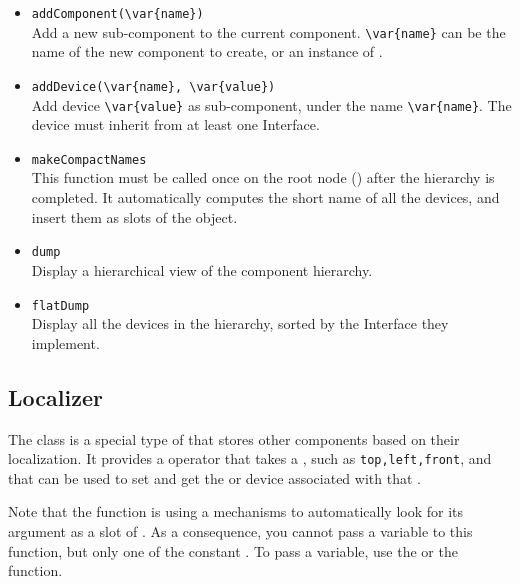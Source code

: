 \begin{itemize}

\item \lstinline|addComponent(\var{name})|\\
  Add a new sub-component to the current component. \lstinline|\var{name}| can
  be the name of the new component to create, or an instance of
  .

\item \lstinline|addDevice(\var{name}, \var{value})|\\
  Add device \lstinline|\var{value}| as sub-component, under the name
  \lstinline|\var{name}|. The device must inherit from at least one Interface.

\item \lstinline|makeCompactNames| \\
  This function must be called once on the root node ()
  after the hierarchy is completed.  It automatically computes the
  short name of all the devices, and insert them as slots of the
   object.

\item \lstinline|dump| \\
  Display a hierarchical view of the component hierarchy.

\item \lstinline|flatDump| \\
  Display all the devices in the hierarchy, sorted by the Interface
  they implement.
\end{itemize}

\subsection{Localizer}

The  class is a special type of  that stores
other components based on their localization. It provides a \code{[]} operator
that takes a , such as \lstinline|top,left,front|, and that
can be used to set and get the  or device associated with
that .

Note that the \code{[]} function is using a mechanisms to automatically look
for its argument as a slot of . As a consequence, you cannot
pass a variable to this function, but only one of the constant
.
To pass a variable, use the  or the 
function.

